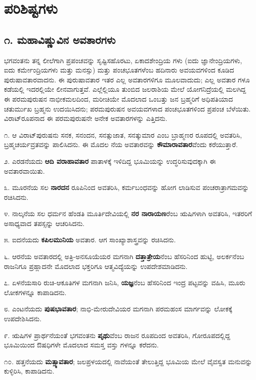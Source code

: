 
\chapter{ಪರಿಶಿಷ್ಟಗಳು}

\section{೧. ಮಹಾವಿಷ್ಣುವಿನ ಅವತಾರಗಳು}

ಭಗವಂತನು ತನ್ನ ಲೀಲೆಗಾಗಿ ಪ್ರಪಂಚವನ್ನು ಸೃಷ್ಟಿಸಹೊರಟು, ಏಕಾದಶೇಂದ್ರಿಯ ಗಳು (ಐದು ಜ್ಞಾನೇಂದ್ರಿಯಗಳು, ಐದು ಕರ್ಮೇಂದ್ರಿಯಗಳು ಮತ್ತು ಮನಸ್ಸು) ಮತ್ತು ಪಂಚಭೂತಗಳೆಂಬ ಹದಿನಾರು ಅವಯವಗಳಿಂದ ಕೂಡಿದ ಪುರುಷಾವತಾರವಾದನು. ಈ ಪುರುಷಾವತಾರ ಇತರ ಎಲ್ಲ ಅವತಾರಗಳಿಗೂ ಮೂಲವಾದುದು; ಎಲ್ಲ ಅವತಾರ ಗಳೂ ಕಡೆಯಲ್ಲಿ ಇದರಲ್ಲಿಯೇ ಲೀನವಾಗುತ್ತವೆ. ಎಲ್ಲೆಲ್ಲಿಯೂ ತುಂಬಿದ ಜಲರಾಶಿಯ ಮೇಲೆ ಯೋಗನಿದ್ರೆಯಲ್ಲಿ ಮಲಗಿದ್ದ ಈ ಪರಮಪುರುಷನ ನಾಭೀಕಮಲದಿಂದ, ಮರೀಚಿಯೇ ಮೊದಲಾದ ಒಂಬತ್ತು ಜನ ಬ್ರಹ್ಮರಿಗೆ ಅಧಿಪತಿಯಾದ ಚತುರ್ಮುಖ ಬ್ರಹ್ಮನು ಉದಯಿಸಿದನು; ಪರಮಪುರುಷನ ಅವಯವಗಳಾದ ಪಂಚಭೂತಗಳಿಂದ ಪ್ರಪಂಚ ಬೆಳೆಯಿತು. ವಿರಾಟ್​ರೂಪನಾದ ಈ ಪರಮಪುರುಷನೇ ಅನೇಕ ಅವತಾರಗಳನ್ನು ಎತ್ತಿದನು. 

೧. ಆ ವಿರಾಟ್​ಪುರುಷನು ಸನಕ, ಸನಂದನ, ಸನತ್ಸುಜಾತ, ಸನತ್ಕುಮಾರ ಎಂಬ ಬ್ರಾಹ್ಮಣರ ರೂಪದಲ್ಲಿ ಅವತರಿಸಿ, ಬ್ರಹ್ಮಚರ್ಯವ್ರತವನ್ನು ಪಾಲಿಸಿದನು. ಈ ಮೊದಲ ನೆಯ ಅವತಾರವನ್ನು \textbf{ಕೌಮಾರಾವತಾರ}ವೆಂದು ಕರೆಯುತ್ತಾರೆ. 

೨. ಎರಡನೆಯದು \textbf{ಆದಿ ವರಾಹಾವತಾರ} ಪಾತಾಳಕ್ಕೆ ಇಳಿದಿದ್ದ ಭೂಮಿಯನ್ನು ಉದ್ಧರಿಸುವುದಕ್ಕಾಗಿ ಈ ಅವತಾರವಾಯಿತು.

೩. ಮೂರನೆಯ ಸಲ \textbf{ನಾರದನ} ರೂಪಿನಿಂದ ಅವತರಿಸಿ, ಕರ್ಮಬಂಧವನ್ನು ಹೋಗ ಲಾಡಿಸುವ ಪಂಚರಾತ್ರಾಗಮವನ್ನು ರಚಿಸಿದನು.

೪. ನಾಲ್ಕನೆಯ ಸಲ ಧರ್ಮನ ಹೆಂಡತಿ ಮೂರ್ತಿದೇವಿಯಲ್ಲಿ \textbf{ನರ ನಾರಾಯಣ}ರೆಂಬ ಋಷಿಗಳಾಗಿ ಅವತರಿಸಿ, ಇತರರಿಗೆ ಅಸಾಧ್ಯವಾದ ತಪಸ್ಸನ್ನು ಆಚರಿಸಿದನು.

೫. ಐದನೆಯದು \textbf{ಕಪಿಲಮುನಿಯ} ಅವತಾರ. ಆಗ ಸಾಂಖ್ಯಾಶಾಸ್ತ್ರವನ್ನು ರಚಿಸಿದನು.

೬. ಆರನೆಯ ಅವತಾರದಲ್ಲಿ ಅತ್ರಿ-ಅನಸೂಯೆಯರ ಮಗನಾಗಿ \textbf{ದತ್ತಾತ್ರೇಯ}ನೆಂಬ ಹೆಸರಿನಿಂದ ಹುಟ್ಟಿ, ಅಲರ್ಕನೆಂಬ ರಾಜನಿಗೂ ಪ್ರಹ್ಲಾದನೇ ಮೊದಲಾದ ಭಕ್ತರಿಗೂ ಆತ್ಮವಿದ್ಯೆಯನ್ನು ಉಪದೇಶಮಾಡಿದನು.

೭. ಏಳನೆಯಸಾರಿ ರುಚಿ-ಆಕೂತಿಗಳ ಮಗನಾಗಿ ಜನಿಸಿ, \textbf{ಯಜ್ಞ}ನೆಂಬ ಹೆಸರಿನಿಂದ ಇಂದ್ರ ಪಟ್ಟವನ್ನು ವಹಿಸಿ, ಮೂರು ಲೋಕಗಳನ್ನೂ ಕಾಪಾಡಿದನು.

೮. ಎಂಟನೆಯದು \textbf{ಪುಷಭಾವತಾರ}; ನಾಭಿ-ಮೇರುದೇವಿಯರ ಮಗನಾಗಿ ಪರಮಹಂಸ ಮಾರ್ಗವನ್ನು ಲೋಕಕ್ಕೆ ಉಪದೇಶಿಸಿದನು.

೯. ಋಷಿಗಳ ಪ್ರಾರ್ಥನೆಯಂತೆ ಭಗವಂತನು \textbf{ಪೃಥು}ವೆಂಬ ರಾಜನ ರೂಪದಿಂದ ಅವತರಿಸಿ, ಗೋರೂಪದಲ್ಲಿದ್ದ ಭೂಮಿಯಿಂದ ಔಷಧಿಗಳೇ ಮೊದಲಾದ ಸಮಸ್ತ ವಸ್ತು ಗಳನ್ನೂ ಕರೆದನು.

೧೦. ಹತ್ತನೆಯದು \textbf{ಮತ್ಸ್ಯಾವತಾರ}; ಜಲಪ್ರಳಯದಲ್ಲಿ ನಾವೆಯಂತೆ ತೇಲುತ್ತಿದ್ದ ಭೂಮಿಯ ಮೇಲೆ ವೈವಸ್ವತ ಮನುವನ್ನು ಕುಳ್ಳಿರಿಸಿ, ಕಾಪಾಡಿದನು.

